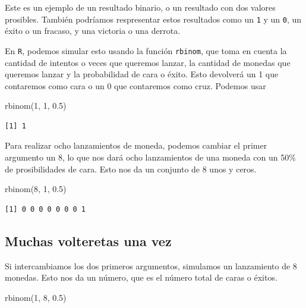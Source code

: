 \documentclass[
  letterpaper,
  DIV=11,
  numbers=noendperiod]{scrreprt}
\newenvironment{Shaded}{\begin{snugshade}}{\end{snugshade}}
\newcommand{\DecValTok}[1]{\textcolor[rgb]{0.68,0.00,0.00}{#1}}
\newcommand{\FloatTok}[1]{\textcolor[rgb]{0.68,0.00,0.00}{#1}}
\newcommand{\FunctionTok}[1]{\textcolor[rgb]{0.28,0.35,0.67}{#1}}
\newcommand{\NormalTok}[1]{\textcolor[rgb]{0.00,0.23,0.31}{#1}}
\begin{document}
Este es un ejemplo de un resultado binario, o un resultado con dos
valores prosibles. También podríamos respresentar estos resultados como
un \texttt{1} y un \texttt{0}, un éxito o un fracaso, y una victoria o
una derrota.

En \texttt{R}, podemos simular esto usando la función \texttt{rbinom},
que toma en cuenta la cantidad de intentos o veces que queremos lanzar,
la cantidad de monedas que queremos lanzar y la probabilidad de cara o
éxito. Esto devolverá un 1 que contaremos como cara o un 0 que
contaremos como cruz. Podemos usar

\begin{Shaded}
\begin{Highlighting}[]
\FunctionTok{rbinom}\NormalTok{(}\DecValTok{1}\NormalTok{, }\DecValTok{1}\NormalTok{, }\FloatTok{0.5}\NormalTok{)}
\end{Highlighting}
\end{Shaded}

\begin{verbatim}
[1] 1
\end{verbatim}

Para realizar ocho lanzamientos de moneda, podemos cambiar el primer
argumento un 8, lo que nos dará ocho lanzamientos de una moneda con un
50\% de prosibilidades de cara. Esto nos da un conjunto de 8 unos y
ceros.

\begin{Shaded}
\begin{Highlighting}[]
\FunctionTok{rbinom}\NormalTok{(}\DecValTok{8}\NormalTok{, }\DecValTok{1}\NormalTok{, }\FloatTok{0.5}\NormalTok{)}
\end{Highlighting}
\end{Shaded}

\begin{verbatim}
[1] 0 0 0 0 0 0 0 1
\end{verbatim}

\hypertarget{muchas-volteretas-una-vez}{%
\subsection{Muchas volteretas una vez}\label{muchas-volteretas-una-vez}}

Si intercambiamos los dos primeros argumentos, simulamos un lanzamiento
de 8 monedas. Esto nos da un número, que es el número total de caras o
éxitos.

\begin{Shaded}
\begin{Highlighting}[]
\FunctionTok{rbinom}\NormalTok{(}\DecValTok{1}\NormalTok{, }\DecValTok{8}\NormalTok{, }\FloatTok{0.5}\NormalTok{)}
\end{Highlighting}
\end{Shaded}
\end{document}
